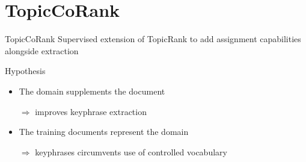 \section{TopicCoRank}
\begin{frame}{TopicCoRank}
  Supervised extension of TopicRank to add assignment capabilities alongside extraction
  
  \vspace{1em}
  
  \begin{block}{Hypothesis}
    \begin{itemize}
      \item{The domain supplements the document}
      \item[$\Rightarrow$]{improves keyphrase extraction}
      \item{The training documents represent the domain}
      \item[$\Rightarrow$]{keyphrases circumvents use of controlled vocabulary}
    \end{itemize}
  \end{block}
\end{frame}

